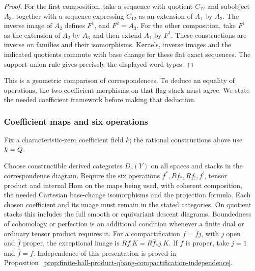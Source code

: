 \begin{proof}
For the first composition, take a sequence with quotient $C_{12}$
and subobject $A_3$, together with a sequence expressing $C_{12}$
as an extension of $A_1$ by $A_2$. The inverse image of $A_2$
defines $F^1$, and $F^2=A_3$. For the other composition, take
$F^1$ as the extension of $A_2$ by $A_3$ and then extend $A_1$
by $F^1$. These constructions are inverse on families and their
isomorphisms. Kernels, inverse images and the indicated quotients
commute with base change for these flat exact sequences. The
support-union rule gives precisely the displayed word types.
\end{proof}

This is a geometric comparison of correspondences. To deduce an
equality of operations, the two coefficient morphisms on that flag
stack must agree. We state the needed coefficient framework before
making that deduction.

\subsubsection*{Coefficient maps and six operations}

Fix a characteristic-zero coefficient field $k$; the rational
constructions above use $k=Q$.

\begin{definition}
\label{def:compact-support-exceptional-pushforward-model}
Choose constructible derived categories $D_c(Y)$ on all spaces and
stacks in the correspondence diagram. Require the six operations
$f^*,Rf_*,Rf_!,f^!$, tensor product and internal Hom on the maps
being used, with coherent composition, the needed Cartesian
base-change isomorphisms and the projection formula. Each chosen
coefficient and its image must remain in the stated categories.
On quotient stacks this includes the full smooth or equivariant
descent diagrams. Boundedness of cohomology or perfection is an
additional condition whenever a finite dual or ordinary tensor
product requires it.
For a compactification $f=\overline f j$, with $j$ open and
$\overline f$ proper, the exceptional image is
$Rf_!K=R\overline f_*j_!K$. If $f$ is proper, take $j=1$
and $\overline f=f$. Independence of this presentation is
proved in Proposition~\ref{prop:finite-hall-product-qbang-compactification-independence}.
\end{definition}

